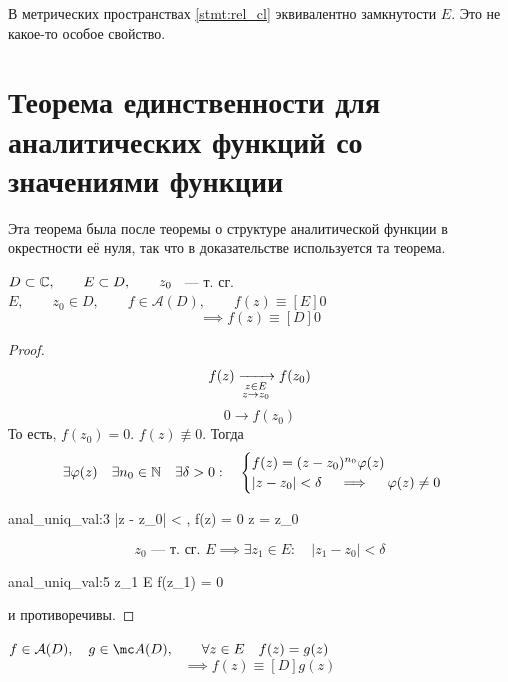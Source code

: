 \begin{remark}
	В метрических пространствах \autoref{stmt:rel_cl} эквивалентно замкнутости $ E $.
	Это не какое-то особое свойство.
\end{remark}

\section{Теорема единственности для аналитических функций со значениями функции}

\begin{note}
	Эта теорема была после теоремы о структуре аналитической функции в окрестности её нуля, так что в доказательстве используется та теорема.
\end{note}

\begin{theorem}
	$ D \subset \mathbb{C}, \qquad E \subset D, \qquad z_0 $ ~--- т. сг. $ E, \qquad z_0 \in D, \qquad f \in \mathcal A(D), \qquad f(z) \equiv[E] 0 $
	$$ \implies f(z) \equiv[D] 0 $$
\end{theorem}

\begin{proof}
	$$ f(z) \xrightarrow[
		\begin{subarray}{c}
			z \in E \\
			z \to z_0
		\end{subarray}]{} f(z_0) $$
	$$ 0 \to f(z_0) $$
	То есть, $ f(z_0) = 0 $.  $ f(z) \not\equiv 0 $. Тогда
	$$ \exists \varphi(z) \quad \exists n_0 \in \mathbb{N} \quad \exists \delta > 0 : \quad
	\begin{cases}
		f(z) = (z - z_0)^{n_0} \varphi(z) \\
		|z - z_0| < \delta \quad \implies \quad \varphi(z) \ne 0
	\end{cases} $$
	\begin{equ}{anal_uniq_val:3}
		\implies {} |z - z_0| < \delta, \quad f(z) = 0 \implies z = z_0
	\end{equ}
	$$ z_0 \text{~--- т. сг. } E \implies \exists z_1 \in E : \quad |z_1 - z_0| < \delta $$
	\begin{equ}{anal_uniq_val:5}
		z_1 \in E \implies f(z_1) = 0
	\end{equ}
	 и  противоречивы.
\end{proof}

\begin{implication}
	$ f \in \mathcal A(D), \quad g \in \mc A(D), \qquad \forall z \in E \quad f(z) = g(z) $
	$$ \implies f(z) \equiv[D] g(z) $$
\end{implication}

